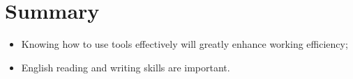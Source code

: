 \documentclass[12pt,a4paper,UTF8]{article}
\begin{document}
\section{Summary}
\begin{itemize}
	\item Knowing how to use tools effectively will greatly enhance working efficiency;
	\item English reading and writing skills are important.
\end{itemize}
\end{document}
